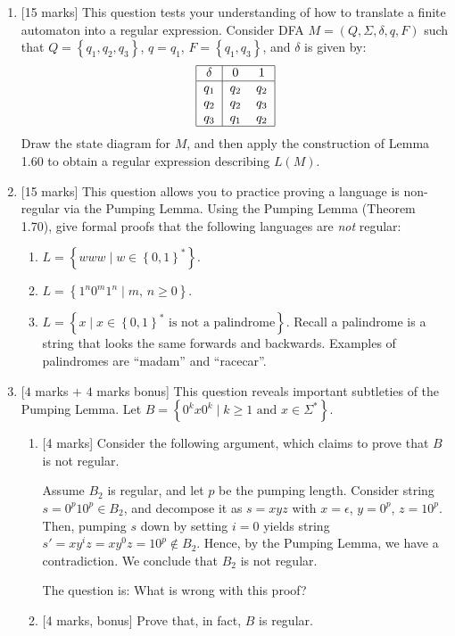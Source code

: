 \documentclass{article}
\newcommand{\set}[1]{{\left\{#1\right\}}}    %
\begin{document}
\begin{enumerate}
    \item {[15 marks]} This question tests your understanding of how to translate a finite automaton into a regular expression. Consider DFA $M=(Q,\Sigma,\delta,q,F)$ such that $Q=\set{q_1,q_2,q_3}$, $q=q_1$, $F=\set{q_1,q_3}$, and $\delta$ is given by:
                \[
\begin{tabular}{|c|cc|}
  \hline
  $\delta$ & 0 & 1 \\
  \hline
  $q_1$ & $q_2$ & $q_2$\\
  $q_2$ & $q_2$ & $q_3$\\
  $q_3$ & $q_1$ & $q_2$\\
  \hline
\end{tabular}
        \]
            Draw the state diagram for $M$, and then apply the construction of Lemma 1.60 to obtain a regular expression describing $L(M)$.
    \item {[15 marks]} This question allows you to practice proving a language is non-regular via the Pumping Lemma. Using the Pumping Lemma (Theorem 1.70), give formal proofs that the following languages are \emph{not} regular:
        \begin{enumerate}
            \item $L=\set{www\mid w\in\set{0,1}^*}$.
            \item $L=\set{1^n0^m1^n\mid m\text{, }n\geq 0}$.
            \item $L=\set{x\mid x\in\set{0,1}^*\text{ is not a palindrome}}$. Recall a palindrome is a string that looks the same forwards and backwards. Examples of palindromes are ``madam'' and ``racecar''.
        \end{enumerate}
    \item  {[$4$ marks $+$ $4$ marks bonus]} This question reveals important subtleties of the Pumping Lemma. Let $B=\set{0^kx0^k \mid k\geq 1\text{ and } x\in\Sigma^*}$.
                \begin{enumerate}
                \item{[4 marks]} Consider the following argument, which claims to prove that $B$ is not regular.

                    Assume $B_2$ is regular, and let $p$ be the pumping length. Consider string $s=0^p10^p\in B_2$, and decompose it as $s=xyz$ with $x=\epsilon$, $y=0^p$, $z=10^p$. Then, pumping $s$ down by setting $i=0$ yields string $s'=xy^iz=xy^0z=10^p\not \in B_2$. Hence, by the Pumping Lemma, we have a contradiction. We conclude that $B_2$ is not regular.

                    The question is: What is wrong with this proof?
                \item {[4 marks, bonus]} Prove that, in fact, $B$ is regular.
            \end{enumerate}
\end{enumerate}
\end{document}
